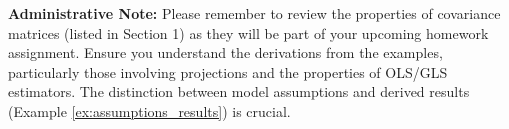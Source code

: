 \documentclass[11pt]{article}
\theoremstyle{definition}
\theoremstyle{remark}
\newenvironment{announcement}
  {\begin{framed}\noindent\textbf{Administrative Note:}\quad}
  {\end{framed}}
\begin{document}
\begin{announcement}
    Please remember to review the properties of covariance matrices (listed in Section 1) as they will be part of your upcoming homework assignment. Ensure you understand the derivations from the examples, particularly those involving projections and the properties of OLS/GLS estimators. The distinction between model assumptions and derived results (Example \ref{ex:assumptions_results}) is crucial.
\end{announcement}
\end{document}
